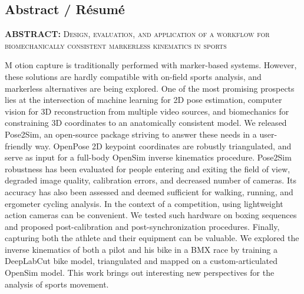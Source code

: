 {}

\vspace*{-1.6cm}
\begin{flushright}
\section*{\fontsize{20pt}{20pt}\selectfont\textnormal{Abstract / Résumé}}
\end{flushright}
\vspace{-.2cm}

\chead[\fancyplain{}{}]
      {\fancyplain{}{}}
\lfoot[\fancyplain{}{}]%
      {\fancyplain{}{}}
\cfoot[\fancyplain{}{\thepage}]
      {\fancyplain{}{\thepage}}
\rfoot[\fancyplain{}{}]%
     {\fancyplain{}{\scriptsize}}
     


\vspace*{1cm}

\noindent\textbf{ABSTRACT: } \textsc{Design, evaluation, and application of a workflow for biomechanically consistent markerless kinematics in sports}

\lettrine[lines=1]{M}{ }otion capture is traditionally performed with marker-based systems. However, these solutions are hardly compatible with on-field sports analysis, and markerless alternatives are being explored. One of the most promising prospects lies at the intersection of machine learning for 2D pose estimation, computer vision for 3D reconstruction from multiple video sources, and biomechanics for constraining 3D coordinates to an anatomically consistent model. We released Pose2Sim, an open-source package striving to answer these needs in a user-friendly way. OpenPose 2D keypoint coordinates are robustly triangulated, and serve as input for a full-body OpenSim inverse kinematics procedure. Pose2Sim robustness has been evaluated for people entering and exiting the field of view, degraded image quality, calibration errors, and decreased number of cameras. Its accuracy has also been assessed and deemed sufficient for walking, running, and ergometer cycling analysis. In the context of a competition, using lightweight action cameras can be convenient. We tested such hardware on boxing sequences and proposed post-calibration and post-synchronization procedures. Finally, capturing both the athlete and their equipment can be valuable. We explored the inverse kinematics of both a pilot and his bike in a BMX race by training a DeepLabCut bike model, triangulated and mapped on a custom-articulated OpenSim model. This work brings out interesting new perspectives for the analysis of sports movement.

